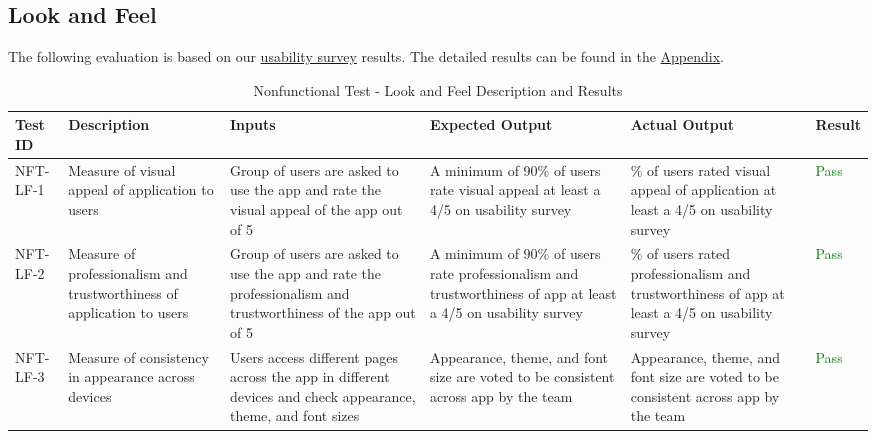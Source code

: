 \documentclass[12pt, titlepage]{article}
\begin{document}
\subsection{Look and Feel}

The following evaluation is based on our \href{https://forms.gle/GUkhZDEA7SVjYAVi8}{usability survey} results. The detailed results can be found in the \hyperref[sec:AppSurveyResults]{Appendix}.

\renewcommand{\arraystretch}{1.8}%
\begin{longtable}{| m{.1\linewidth} |>{\raggedright\arraybackslash} m{.14\linewidth} |>{\raggedright\arraybackslash} m{.19\linewidth}|>{\raggedright\arraybackslash} m{.21\linewidth} |>{\raggedright\arraybackslash} m{.19\linewidth}|>{\centering\arraybackslash} m{.08\linewidth}|}
\caption{Nonfunctional Test - Look and Feel Description and Results}
\label{tab:LookAndFeelTestResults}
\\ \hline
\textbf{Test ID} & \textbf{Description} & \textbf{Inputs} & \textbf{Expected Output} & \textbf{Actual Output} & \textbf{Result} \\
\hline
\endfirsthead
\endfoot

\hline
NFT-LF-1 & Measure of visual appeal of application to users & Group of users are asked to use the app and rate the visual appeal of the app out of 5 & A minimum of 90\% of users rate visual appeal at least a 4/5 on usability survey & 95.5\% of users rated visual appeal of application at least a 4/5 on usability survey & \textcolor{Green}{Pass} \\
\hline
NFT-LF-2 & Measure of professionalism and trustworthiness of application to users & Group of users are asked to use the app and rate the professionalism and trustworthiness of the app out of 5 & A minimum of 90\% of users rate professionalism and trustworthiness of app at least a 4/5 on usability survey & 95.5\% of users rated professionalism and trustworthiness of app at least a 4/5 on usability survey & \textcolor{Green}{Pass} \\
\hline
NFT-LF-3 & Measure of consistency in appearance across devices & Users access different pages across the app in different devices and check appearance, theme, and font sizes & Appearance, theme, and font size are voted to be consistent across app by the team & Appearance, theme, and font size are voted to be consistent across app by the team & \textcolor{Green}{Pass} \\
\hline

\end{longtable}
\end{document}
